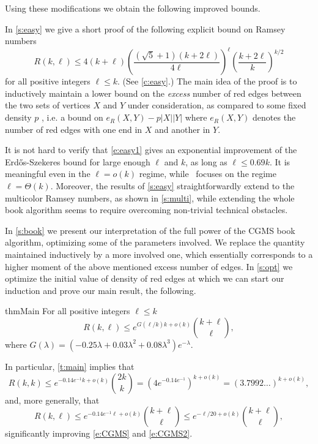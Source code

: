 \documentclass[reqno,final,12pt]{amsart}
\newcommand{\fs}[2]{\left(\frac{#1}{#2}\right)}
\newcommand{\s}[1]{\left(#1\right)}
\begin{document}
Using these modifications we obtain the following improved bounds. 

\vskip 5pt

In \cref{s:easy} we give a short proof of the following explicit bound on
Ramsey numbers
\begin{equation}\label{e:easy1}R(k,\ell) \leq 4(k+\ell)\fs{\left(\sqrt{5}+1\right) (k+2 \ell)}{4 \ell}^\ell \fs{k + 2\ell}{k}^{k/2}\end{equation}
for all positive integers $\ell \leq k$. (See \cref{c:easy}.)
The main idea of the proof is to inductively maintain a lower bound on the \emph{excess} number of red edges between the two sets of vertices $X$ and $Y$ under consideration, as compared to some fixed density $p$ , i.e. a bound on  $e_R(X,Y)-p|X||Y|$ where $e_R(X,Y)$ denotes the number of red edges with one end in $X$ and another in $Y$.

It is not hard to verify that \eqref{e:easy1} gives an exponential improvement of the Erd\H{o}s-Szekeres bound for large enough $\ell$ and $k$, as long as $\ell \leq 0.69k$. It is meaningful even in the $\ell=o(k)$ regime, while~\cite{CGMS23} focuses on the regime $\ell=\Theta(k)$. Moreover, the results of \cref{s:easy} straightforwardly extend to the multicolor Ramsey numbers, as shown in \cref{s:multi}, while extending the whole book algorithm seems to require overcoming non-trivial technical obstacles.

\vskip 5pt
In \cref{s:book} we present our interpretation of the full power of the CGMS book algorithm, optimizing some of the parameters involved. We replace the quantity maintained inductively by a more involved one, which  essentially corresponds to a higher moment of the above mentioned excess number of edges. In \cref{s:opt} we optimize the initial value of density of red edges at which we can start our induction and prove our main result, the following. 

\begin{restatable}{thm}{Main}\label{t:main} 
	For all positive integers $\ell \leq k$	$$ R(k,\ell) \leq e^{G(\ell/k)k+o(k)}\binom{k+\ell}{\ell},  $$
	where $G(\lambda)= \s{-0.25\lambda + 0.03 \lambda^2 + 0.08\lambda^3}e^{-\lambda}.$
\end{restatable}

In particular, \cref{t:main} implies that $$R(k,k) \leq e^{-0.14e^{-1}k+o(k)}\binom{2k}{k} = (4e^{-0.14e^{-1}})^{k+o(k)}=(3.7992\ldots)^{k+o(k)}, $$
and, more generally, that
$$R(k,\ell) \leq e^{-0.14e^{-1}\ell+o(k)}\binom{k+\ell}{\ell} \leq e^{-\ell/20+o(k)}\binom{k+\ell}{\ell},$$
significantly improving \eqref{e:CGMS} and \eqref{e:CGMS2}. 
\end{document}
